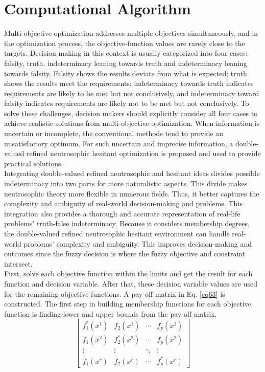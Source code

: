 \documentclass[a4paper]{elsarticle}
\begin{document}
{\section{Computational Algorithm}
\label{s5}
\noindent
Multi-objective optimization addresses multiple objectives simultaneously, and in the optimization process, the objective-function values are rarely close to the targets. Decision making in this context is usually categorized into four cases: falsity, truth, indeterminacy leaning towards truth and indeterminacy leaning towards falsity. Falsity shows the results deviate from what is expected; truth shows the results meet the requirements; indeterminacy towards truth indicates requirements are likely to be met but not conclusively, and indeterminacy toward falsity indicates requirements are likely not to be met but not conclusively. To solve these challenges, decision makers should explicitly consider all four cases to achieve realistic solutions from multi-objective optimization. When information is uncertain or incomplete, the conventional methods tend to provide an unsatisfactory optimum. For such uncertain and imprecise information, a double-valued refined neutrosophic hesitant optimization is proposed and used to provide practical solutions.\\
Integrating double-valued refined neutrosophic and hesitant ideas divides possible indeterminacy into two parts for more naturalistic aspects. This divide makes neutrosophic theory more flexible in numerous fields. Thus, it better captures the complexity and ambiguity of real-world decision-making and problems. This integration also provides a thorough and accurate representation of real-life problems' truth-false indeterminacy. Because it considers membership degrees, the double-valued refined neutrosophic hesitant environment can handle real-world problems' complexity and ambiguity. This improves decision-making and outcomes since the fuzzy decision is where the fuzzy objective and constraint intersect. \\
First, solve each objective function within the limits and get the result for each function and decision variable. After that, these decision variable values are used for the remaining objective functions. A pay-off matrix in Eq. \ref{eq63} is constructed. The first step in building membership functions for each objective function is finding lower and upper bounds from the pay-off matrix.\\

\begin{equation}
\label{eq63}
\begin{bmatrix}
f^*_1({x^1}) & f_2({x^1}) & \cdots & f_p({x^1}) \\
f_1({x^2}) & f^*_2({x^2}) & \cdots & f_p({x^2}) \\
\vdots & \vdots & \ddots & \vdots \\
f_1({x^r}) & f_2({x^r}) & \cdots & f^*_p({x^r})
\end{bmatrix}
\end{equation}

}
\end{document}

